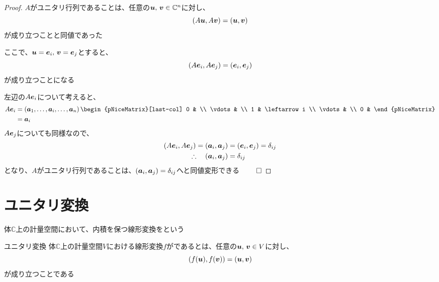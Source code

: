 \documentclass[../../../topic_linear-algebra]{subfiles}
\begin{document}
\begin{proof}
  $A$がユニタリ行列であることは、任意の$\vb*{u},\,\vb*{v} \in \mathbb{C}^n$に対し、
  \begin{equation*}
    (A\vb*{u}, A\vb*{v}) = (\vb*{u}, \vb*{v})
  \end{equation*}
  が成り立つことと同値であった

  ここで、$\vb*{u} = \vb*{e}_i,\, \vb*{v} = \vb*{e}_j$とすると、
  \begin{equation*}
    (A\vb*{e}_i, A\vb*{e}_j) = (\vb*{e}_i, \vb*{e}_j)
  \end{equation*}
  が成り立つことになる

  \br

  左辺の$A\vb*{e}_i$について考えると、
  \begin{align*}
    A\vb*{e}_i & = \left( \vb*{a}_1, \ldots, \vb*{a}_i, \ldots, \vb*{a}_n \right)
    \begin{pNiceMatrix}[last-col]
      0      &              \\
      \vdots &              \\
      1      & \leftarrow i \\
      \vdots &              \\
      0      &
    \end{pNiceMatrix}                                                  \\
               & = \vb*{a}_i
  \end{align*}
  $A\vb*{e}_j$についても同様なので、
  \begin{align*}
    (A\vb*{e}_i, A\vb*{e}_j) = (\vb*{a}_i, \vb*{a}_j) & = (\vb*{e}_i, \vb*{e}_j) = \delta_{ij} \\
    \therefore \quad (\vb*{a}_i, \vb*{a}_j)           & = \delta_{ij}
  \end{align*}
  となり、$A$がユニタリ行列であることは、$(\vb*{a}_i, \vb*{a}_j) = \delta_{ij}$へと同値変形できる $\qed$
\end{proof}

\sectionline
\section{ユニタリ変換}

体$\mathbb{C}$上の計量空間において、内積を保つ線形変換をという

\begin{definition}{ユニタリ変換}
  体$\mathbb{C}$上の計量空間$V$における線形変換$f$がであるとは、任意の$\vb*{u},\,\vb*{v} \in V$に対し、
  \begin{equation*}
    (f(\vb*{u}),f(\vb*{v})) = (\vb*{u},\vb*{v})
  \end{equation*}
  が成り立つことである
\end{definition}
\end{document}
